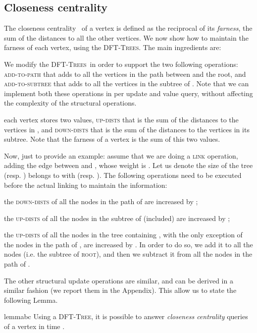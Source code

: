 \documentclass[a4paper,USenglish]{lipics}
\newcommand{\dft}{\textsc{DFT-Tree}}
\newcommand{\dfts}{\textsc{DFT-Trees}}
\begin{document}
\subsection{Closeness centrality}
\label{sub:cc}
The closeness centrality~\cite{Bav50} of a vertex is defined as the reciprocal of its \emph{farness}, the sum of the distances to all the other vertices. We now show how to maintain the farness of each vertex, using the \dfts. The main ingredients are:
\begin{compactitem}
\item We modify the \dfts\ in order to support the two following operations: \textsc{add-to-path} that adds  to all the vertices in the path between  and the root, and \textsc{add-to-subtree} that adds  to all the vertices in the subtree of . Note that we can implement both these operations in  per update and value query, without affecting the complexity of the structural operations.
\item each vertex stores two values, \textsc{up-dists} that is the sum of the distances to the vertices in , and \textsc{down-dists} that is the sum of the distances to the vertices in its subtree. Note that the farness of a vertex is the sum of this two values. 
\end{compactitem}
Now, just to provide an example: assume that we are doing a \textsc{link} operation, adding the edge between  and , whose weight is . Let us denote the size of the tree  (resp. ) belongs to with  (resp. ). The following operations need to be executed before the actual linking to maintain the information:
\begin{compactitem}
\item the \textsc{down-dists} of all the nodes in the path of  are increased by ;
\item the \textsc{up-dists} of all the nodes in the subtree of  (included) are increased by ;
\item the \textsc{up-dists} of all the nodes in the tree containing , with the only exception of the nodes in the path of , are increased by . In order to do so, we add it to all the nodes (i.e. the subtree of \textsc{root}), and then we subtract it from all the nodes in the path of . 
\end{compactitem}

The other structural update operations are similar, and can be derived in a similar fashion (we report them in the Appendix). This allow us to state the following Lemma.
\begin{restatable}{lemma}{bc}
Using a \dft, it is possible to answer \emph{closeness centrality} queries of a vertex in time .
\end{restatable}
\end{document}

